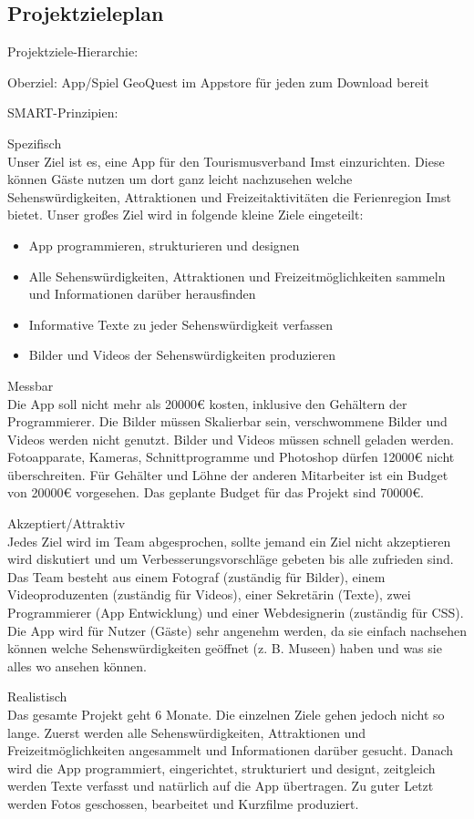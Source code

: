 \subsection{Projektzieleplan}
Projektziele-Hierarchie:

Oberziel: App/Spiel GeoQuest im Appstore für jeden zum Download bereit

SMART-Prinzipien:

Spezifisch\\
Unser Ziel ist es, eine App für den Tourismusverband Imst einzurichten. Diese können Gäste nutzen um dort ganz leicht nachzusehen welche Sehenswürdigkeiten, Attraktionen und Freizeitaktivitäten die Ferienregion Imst bietet. Unser großes Ziel wird in folgende kleine Ziele eingeteilt:
\begin{itemize}
\item App programmieren, strukturieren und designen
\item Alle Sehenswürdigkeiten, Attraktionen und Freizeitmöglichkeiten sammeln und Informationen darüber herausfinden
\item Informative Texte zu jeder Sehenswürdigkeit verfassen
\item Bilder und Videos der Sehenswürdigkeiten produzieren
\end{itemize}
Messbar\\
Die App soll nicht mehr als 20000€ kosten, inklusive den Gehältern der Programmierer. Die Bilder müssen Skalierbar sein, verschwommene Bilder und Videos werden nicht genutzt. Bilder und Videos müssen schnell geladen werden. Fotoapparate, Kameras, Schnittprogramme und Photoshop dürfen 12000€ nicht überschreiten. Für Gehälter und Löhne der anderen Mitarbeiter ist ein Budget von 20000€ vorgesehen. Das geplante Budget für das Projekt sind 70000€.

Akzeptiert/Attraktiv\\
Jedes Ziel wird im Team abgesprochen, sollte jemand ein Ziel nicht akzeptieren wird diskutiert und um Verbesserungsvorschläge gebeten bis alle zufrieden sind. Das Team besteht aus einem Fotograf (zuständig für Bilder), einem Videoproduzenten (zuständig für Videos), einer Sekretärin (Texte), zwei Programmierer (App Entwicklung) und einer Webdesignerin (zuständig für CSS). 
Die App wird für Nutzer (Gäste) sehr angenehm werden, da sie einfach nachsehen können welche Sehenswürdigkeiten geöffnet (z. B. Museen) haben und was sie alles wo ansehen können.

Realistisch\\
Das gesamte Projekt geht 6 Monate. Die einzelnen Ziele gehen jedoch nicht so lange. Zuerst werden alle Sehenswürdigkeiten, Attraktionen und Freizeitmöglichkeiten angesammelt und Informationen darüber gesucht. Danach wird die App programmiert, eingerichtet, strukturiert und designt, zeitgleich werden Texte verfasst und natürlich auf die App übertragen. Zu guter Letzt werden Fotos geschossen, bearbeitet und Kurzfilme produziert.

